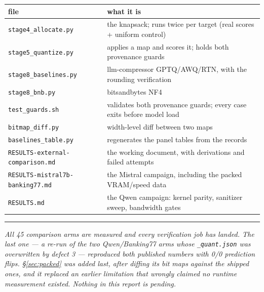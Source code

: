 \documentclass[11pt]{article}
\newcommand{\code}[1]{\texttt{#1}}
\begin{document}
\begin{center}\small
\begin{tabular}{@{}ll@{}}
\toprule
file & what it is \\
\midrule
\code{stage4\_allocate.py} & the knapsack; runs twice per target (real scores + uniform control) \\
\code{stage5\_quantize.py} & applies a map and scores it; holds both provenance guards \\
\code{stage8\_baselines.py} & llm-compressor GPTQ/AWQ/RTN, with the rounding verification \\
\code{stage8\_bnb.py} & bitsandbytes NF4 \\
\code{test\_guards.sh} & validates both provenance guards; every case exits before model load \\
\code{bitmap\_diff.py} & width-level diff between two maps \\
\code{baselines\_table.py} & regenerates the panel tables from the records \\
\code{RESULTS-external-comparison.md} & the working document, with derivations and failed attempts \\
\code{RESULTS-mistral7b-banking77.md} & the Mistral campaign, including the packed VRAM/speed data \\
\code{RESULTS.md} & the Qwen campaign: kernel parity, sanitizer sweep, bandwidth gates \\
\bottomrule
\end{tabular}
\end{center}

\vspace{1.5em}
\begin{center}
{\color{dqblue}\rule{0.5\textwidth}{0.8pt}}
\end{center}
\vspace{0.5em}

{\small\itshape
All 45 comparison arms are measured and every verification job has landed. The last one --- a
re-run of the two Qwen/Banking77 arms whose \code{\_quant.json} was overwritten by defect 3 ---
reproduced both published numbers with 0/0 prediction flips. \S\ref{sec:packed} was added last,
after diffing its bit maps against the shipped ones, and it replaced an earlier limitation that
wrongly claimed no runtime measurement existed. Nothing in this report is pending.\par}
\end{document}
